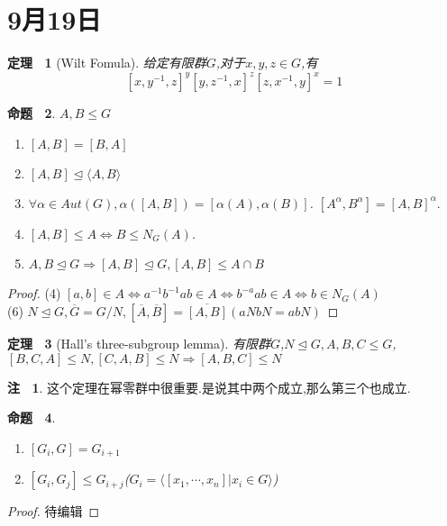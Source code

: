 \documentclass[a4paper]{ctexart}
\theoremstyle{plain}
\newtheorem{thm}{定理~}[section]
\newtheorem{prop}[thm]{命题~}
\theoremstyle{definition}
\newtheorem{rem}{注~}
\begin{document}
\pagestyle{plain}
\noindent
{}
\section{9月19日}
\begin{thm}[Wilt Fomula]
给定有限群$G$,对于$x,y,z\in G$,有
\[[x,y^{-1},z]^y[y,z^{-1},x]^z[z,x^{-1},y]^x=1\]
\end{thm}
\begin{prop}
$A,B\leq G$
\begin{enumerate}[(1)]
\item $[A,B]=[B,A]$
\item $[A,B]\unlhd \langle A,B\rangle$
\item $\forall \alpha \in Aut(G),\alpha([A,B])=[\alpha(A),\alpha(B)]$.
$[A^\alpha,B^\alpha]=[A,B]^\alpha.$
\item $[A,B]\leq A\Leftrightarrow B\leq N_G(A)$.
\item $A,B\unlhd G\Rightarrow [A,B]\unlhd G,[A,B]\leq A\cap B$
\end{enumerate}
\end{prop}
\begin{proof}
(4) $[a,b]\in A \Leftrightarrow a^{-1}b^{-1}ab\in A \Leftrightarrow b^{-a}ab\in A \Leftrightarrow b\in N_G(A)$\\
(6) $N\unlhd G,\overline{G}=G/N,[\overline{A},\overline{B}]=\overline{[A,B]}(aNbN=abN)$
\end{proof}
\begin{thm}[Hall's three-subgroup lemma]
有限群$G$,$N\unlhd G,A,B,C \leq G$,$[B,C,A]\leq N,[C,A,B]\leq N\Rightarrow [A,B,C]\leq N$
\end{thm}
\begin{rem}
这个定理在幂零群中很重要.是说其中两个成立,那么第三个也成立.
\end{rem}
\begin{prop}
\begin{enumerate}[(1)]
\item $[G_i,G]=G_{i+1}$
\item $[G_i,G_j]\leq G_{i+j}$($G_i=\langle [x_1,\cdots,x_n]|x_i\in G\rangle$)
\end{enumerate}
\end{prop}
\begin{proof}
待编辑
\end{proof}
\end{document}
